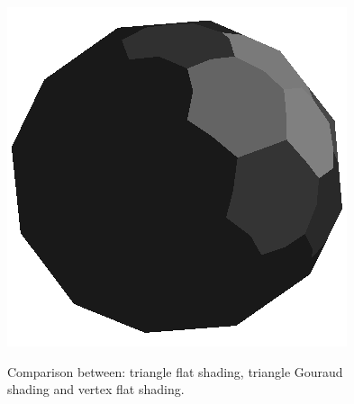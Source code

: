 \begin{figure}[!h]
    \label{fig:gouraud-shading}
    \endminipage\hfill
    \centering
    \includegraphics[scale=0.5]{images/extentflatshading.png}\label{fig:flat-shading-vertex}
    \endminipage
    \caption{Comparison between: triangle flat shading, triangle Gouraud shading and vertex flat shading.}
    \label{fig:comparison-icosahedron}
\end{figure}

